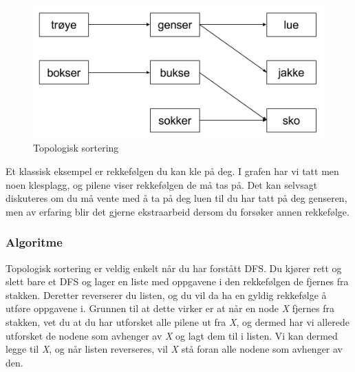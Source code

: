 \begin{boxed}
\begin{figure}[H]
\includegraphics[scale=0.7]{images/topologisk}
\centering %
\caption{Topologisk sortering}
\label{fig:topologisk}
\end{figure}

Et klassisk eksempel er rekkefølgen du kan kle på deg. I grafen har vi tatt men noen klesplagg, og pilene viser rekkefølgen de må tas på. Det kan selvsagt diskuteres om du må vente med å ta på deg luen til du har tatt på deg genseren, men av erfaring blir det gjerne ekstraarbeid dersom du forsøker annen rekkefølge.
\end{boxed}

\subsubsection{Algoritme}
Topologisk sortering er veldig enkelt når du har forstått DFS. Du kjører rett og slett bare et DFS og lager en liste med oppgavene i den rekkefølgen de fjernes fra stakken. Deretter reverserer du listen, og du vil da ha en gyldig rekkefølge å utføre oppgavene i. Grunnen til at dette virker er at når en node \textit{X} fjernes fra stakken, vet du at du har utforsket alle pilene ut fra \textit{X}, og dermed har vi allerede utforsket de nodene som avhenger av \textit{X} og lagt dem til i listen. Vi kan dermed legge til \textit{X}, og når listen reverseres, vil \textit{X} stå foran alle nodene som avhenger av den.

